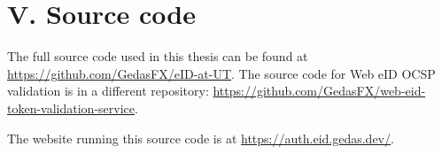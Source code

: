 \section*{V. Source code}

The full source code used in this thesis can be found at \url{https://github.com/GedasFX/eID-at-UT}. The source code for Web eID OCSP validation is in a different repository: \url{https://github.com/GedasFX/web-eid-token-validation-service}.

The website running this source code is at \url{https://auth.eid.gedas.dev/}.